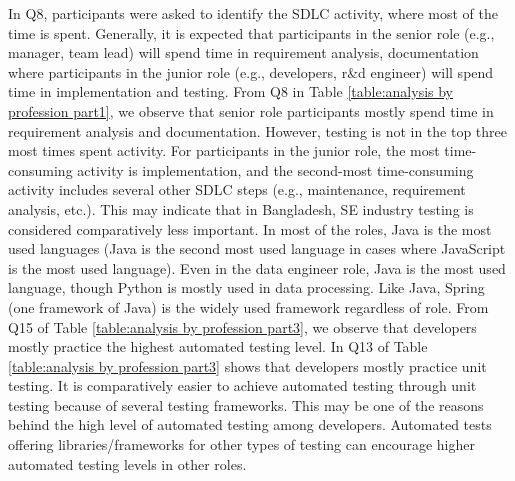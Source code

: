 In Q8, participants were asked to identify the SDLC activity, where most of the time is spent. Generally, it is expected that participants in the senior role (e.g., manager, team lead) will spend time in requirement analysis, documentation where participants in the junior role (e.g., developers, r\&d engineer) will spend time in implementation and testing. From Q8 in Table \ref{table:analysis by profession part1}, we observe that senior role participants mostly spend time in requirement analysis and documentation. However, testing is not in the top three most times spent activity. For participants in the junior role, the most time-consuming activity is implementation, and the second-most time-consuming activity includes several other SDLC steps (e.g., maintenance, requirement analysis, etc.). This may indicate that in Bangladesh, SE industry testing is considered comparatively less important.
In most of the roles, Java is the most used languages (Java is the second most used language in cases where JavaScript is the most used language). Even in the data engineer role, Java is the most used language, though Python is mostly used in data processing. Like Java, Spring (one framework of Java) is the widely used framework regardless of role.
From Q15 of Table \ref{table:analysis by profession part3}, we observe that developers mostly practice the highest automated testing level. In Q13 of Table \ref{table:analysis by profession part3} shows that developers mostly practice unit testing. It is comparatively easier to achieve automated testing through unit testing because of several testing frameworks. This may be one of the reasons behind the high level of automated testing among developers. Automated tests offering libraries/frameworks for other types of testing can encourage higher automated testing levels in other roles.
